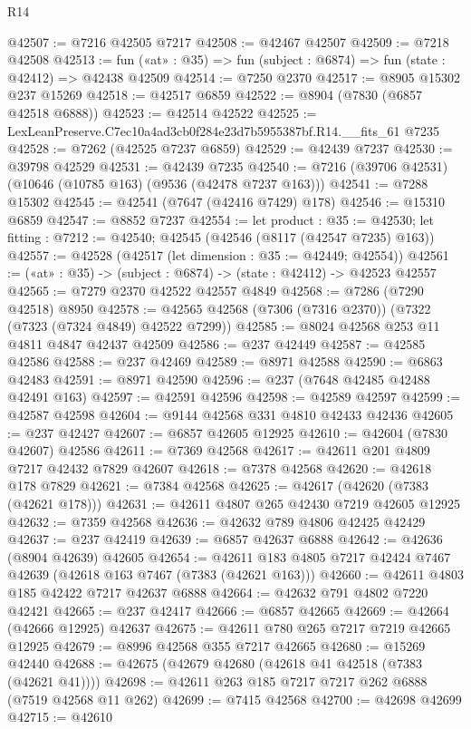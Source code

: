 \begin{lexlean}{R14}
\begin{coremodule}
@42507 := @7216 @42505 @7217
@42508 := @42467 @42507
@42509 := @7218 @42508
@42513 := fun («at» : @35) => fun (subject : @6874) => fun (state : @42412) => @42438 @42509
@42514 := @7250 @2370
@42517 := @8905 @15302 @237 @15269
@42518 := @42517 @6859
@42522 := @8904 (@7830 (@6857 @42518 @6888))
@42523 := @42514 @42522
@42525 := LexLeanPreserve.C7ec10a4ad3cb0f284e23d7b5955387bf.R14.__fits_61 @7235
@42528 := @7262 (@42525 @7237 @6859)
@42529 := @42439 @7237
@42530 := @39798 @42529
@42531 := @42439 @7235
@42540 := @7216 (@39706 @42531) (@10646 (@10785 @163) (@9536 (@42478 @7237 @163)))
@42541 := @7288 @15302
@42545 := @42541 (@7647 (@42416 @7429) @178)
@42546 := @15310 @6859
@42547 := @8852 @7237
@42554 := let product : @35 := @42530;
  let fitting : @7212 := @42540; @42545 (@42546 (@8117 (@42547 @7235) @163))
@42557 := @42528 (@42517 (let dimension : @35 := @42449; @42554))
@42561 := («at» : @35) -> (subject : @6874) -> (state : @42412) -> @42523 @42557
@42565 := @7279 @2370 @42522 @42557 @4849
@42568 := @7286 (@7290 @42518) @8950
@42578 := @42565 @42568 (@7306 (@7316 @2370)) (@7322 (@7323 (@7324 @4849) @42522 @7299))
@42585 := @8024 @42568 @253 @11 @4811 @4847 @42437 @42509
@42586 := @237 @42449
@42587 := @42585 @42586
@42588 := @237 @42469
@42589 := @8971 @42588
@42590 := @6863 @42483
@42591 := @8971 @42590
@42596 := @237 (@7648 @42485 @42488 @42491 @163)
@42597 := @42591 @42596
@42598 := @42589 @42597
@42599 := @42587 @42598
@42604 := @9144 @42568 @331 @4810 @42433 @42436
@42605 := @237 @42427
@42607 := @6857 @42605 @12925
@42610 := @42604 (@7830 @42607) @42586
@42611 := @7369 @42568
@42617 := @42611 @201 @4809 @7217 @42432 @7829 @42607
@42618 := @7378 @42568
@42620 := @42618 @178 @7829
@42621 := @7384 @42568
@42625 := @42617 (@42620 (@7383 (@42621 @178)))
@42631 := @42611 @4807 @265 @42430 @7219 @42605 @12925
@42632 := @7359 @42568
@42636 := @42632 @789 @4806 @42425 @42429
@42637 := @237 @42419
@42639 := @6857 @42637 @6888
@42642 := @42636 (@8904 @42639) @42605
@42654 := @42611 @183 @4805 @7217 @42424 @7467 @42639 (@42618 @163 @7467 (@7383 (@42621 @163)))
@42660 := @42611 @4803 @185 @42422 @7217 @42637 @6888
@42664 := @42632 @791 @4802 @7220 @42421
@42665 := @237 @42417
@42666 := @6857 @42665
@42669 := @42664 (@42666 @12925) @42637
@42675 := @42611 @780 @265 @7217 @7219 @42665 @12925
@42679 := @8996 @42568 @355 @7217 @42665
@42680 := @15269 @42440
@42688 := @42675 (@42679 @42680 (@42618 @41 @42518 (@7383 (@42621 @41))))
@42698 := @42611 @263 @185 @7217 @7217 @262 @6888 (@7519 @42568 @11 @262)
@42699 := @7415 @42568
@42700 := @42698 @42699
@42715 := @42610

\end{coremodule}
\end{lexlean}
